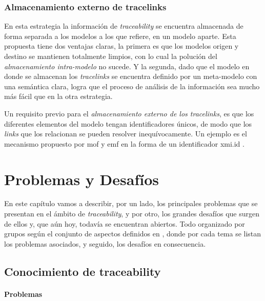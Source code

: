\documentclass[a4paper,12pt,oneside,spanish]{book}
\begin{document}
\subsection{Almacenamiento externo de tracelinks}

En esta estrategia la información de \textit{traceability} se encuentra almacenada de forma separada a los modelos a los que refiere, en un modelo aparte. Esta propuesta tiene dos ventajas claras, la primera es que los modelos origen y destino se mantienen totalmente limpios, con lo cual la polución del \textit{almacenamiento intra-modelo} no sucede. Y la segunda, dado que el modelo en donde se almacenan los \textit{tracelinks} se encuentra definido por un meta-modelo con una semántica clara, logra que el proceso de análisis de la información sea mucho más fácil que en la otra estrategia.

Un requisito previo para el \textit{almacenamiento externo de los tracelinks}, es que los diferentes elementos del modelo tengan identificadores únicos, de modo que los \textit{links} que los relacionan se pueden resolver inequívocamente. Un ejemplo es el mecanismo propuesto por \gls{mof} y \gls{emf} en la forma de un identificador \textsf{xmi.id} .




\chapter{Problemas y Desafíos}
\label{cap:ProblemasDesafios}

En este capítulo vamos a describir, por un lado, los principales problemas que se presentan en el ámbito de \textit{traceability}, y por otro, los grandes desafíos que surgen de ellos y, que aún hoy, todavía se encuentran abiertos. Todo organizado por grupos según el conjunto de aspectos definidos en \cite{Excellence}, donde por cada tema se listan los problemas asociados, y seguido, los desafíos en consecuencia.

\section{Conocimiento de traceability}

\subsubsection{Problemas}
\end{document}
